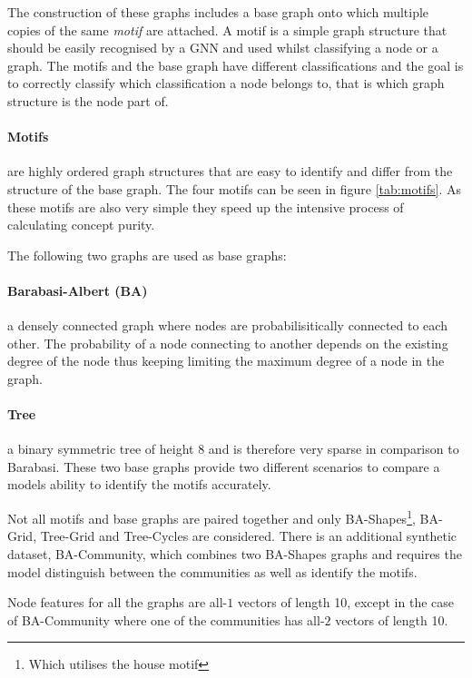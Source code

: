 The construction of these graphs includes a base graph onto which multiple copies of the same \emph{motif} are attached.
A motif is a simple graph structure that should be easily recognised by a GNN and used whilst classifying a node or a graph.
The motifs and the base graph have different classifications and the goal is to correctly classify which classification a node belongs to, that is which graph structure is the node part of.

\paragraph{Motifs}

are highly ordered graph structures that are easy to identify and differ from the structure of the base graph.
The four motifs can be seen in figure \ref{tab:motifs}.
As these motifs are also very simple they speed up the intensive process of calculating concept purity.

The following two graphs are used as base graphs:

\paragraph{Barabasi-Albert (BA)}
a densely connected graph where nodes are probabilisitically connected to each other.
The probability of a node connecting to another depends on the existing degree of the node thus keeping limiting the maximum degree of a node in the graph.

\paragraph{Tree}
a binary symmetric tree of height 8 and is therefore very sparse in comparison to Barabasi.
These two base graphs provide two different scenarios to compare a models ability to identify the motifs accurately.

Not all motifs and base graphs are paired together and only BA-Shapes\footnote{Which utilises the house motif}, BA-Grid, Tree-Grid and Tree-Cycles are considered.
There is an additional synthetic dataset, BA-Community, which combines two BA-Shapes graphs and requires the model distinguish between the communities as well as identify the motifs.

Node features for all the graphs are all-$1$ vectors of length 10, except in the case of BA-Community where one of the communities has all-$2$ vectors of length 10.

